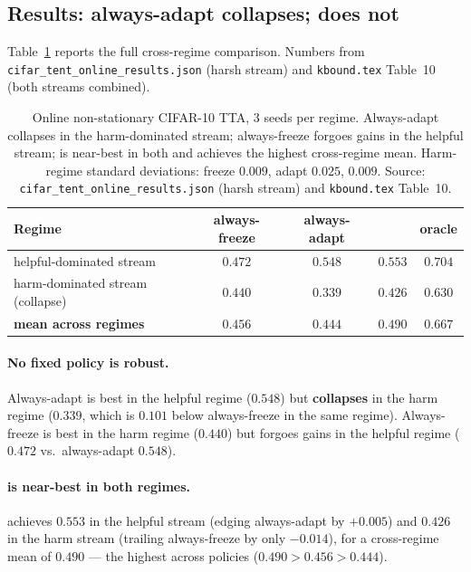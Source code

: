 \subsection{Results: always-adapt collapses; \KGA{} does not}\label{sec:exp2-online-results}

Table~\ref{tab:exp2-online} reports the full cross-regime comparison.  Numbers
from \texttt{cifar\_tent\_online\_results.json} (harsh stream) and
\texttt{kbound.tex} Table~10 (both streams combined).

\begin{table}[ht]
\centering
\small
\caption{Online non-stationary CIFAR-10 TTA, 3 seeds per regime.  Always-adapt
collapses in the harm-dominated stream; always-freeze forgoes gains in the
helpful stream; \KGA{} is near-best in both and achieves the highest cross-regime
mean.  Harm-regime standard deviations: freeze $0.009$, adapt $0.025$, \KGA{}
$0.009$.  Source: \texttt{cifar\_tent\_online\_results.json} (harsh stream) and
\texttt{kbound.tex} Table~10.}
\label{tab:exp2-online}
\begin{tabular}{lcccc}
\toprule
Regime & always-freeze & always-adapt & \textbf{\KGA{}} & oracle \\
\midrule
helpful-dominated stream     & $0.472$ & $0.548$ & $\mathbf{0.553}$ & $0.704$ \\
harm-dominated stream (collapse) & $0.440$ & $0.339$ & $0.426$ & $0.630$ \\
\midrule
\textbf{mean across regimes} & $0.456$ & $0.444$ & $\mathbf{0.490}$ & $0.667$ \\
\bottomrule
\end{tabular}
\end{table}

\paragraph{No fixed policy is robust.}
Always-adapt is best in the helpful regime ($0.548$) but \textbf{collapses} in the
harm regime ($0.339$, which is $0.101$ below always-freeze in the same regime).
Always-freeze is best in the harm regime ($0.440$) but forgoes gains in the helpful
regime ($0.472$ vs.\ always-adapt $0.548$).

\paragraph{\KGA{} is near-best in both regimes.}
\KGA{} achieves $0.553$ in the helpful stream (edging always-adapt by $+0.005$) and
$0.426$ in the harm stream (trailing always-freeze by only $-0.014$), for a cross-regime
mean of $0.490$ --- the highest across policies ($0.490 > 0.456 > 0.444$).

